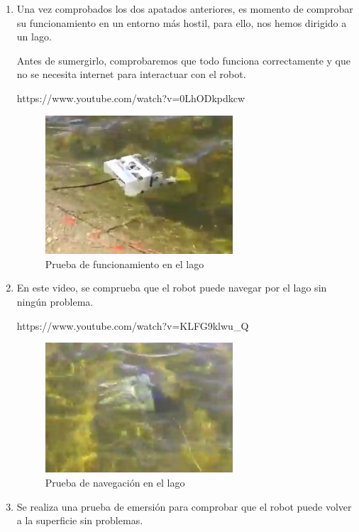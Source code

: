 \begin{enumerate}
\item Una vez comprobados los dos apatados anteriores, es momento de comprobar su funcionamiento en un entorno más hostil, para ello, nos hemos dirigido a un lago.
 
Antes de sumergirlo, comprobaremos que todo funciona correctamente y que no se necesita internet para interactuar con el robot.

https://www.youtube.com/watch?v=0LhODkpdkcw

 \begin{figure} [hbtp]
  \begin{center}
    \includegraphics[width=7cm]{img/cap5/lago1}
  \end{center}
  \caption{Prueba de funcionamiento en el lago}
  \label{fig:lago}
 \end{figure}
 

\newpage
\item En este video, se comprueba que el robot puede navegar por el lago sin ningún problema.
 
https://www.youtube.com/watch?v=KLFG9klwu\_Q
 
 \begin{figure} [hbtp]
  \begin{center}
    \includegraphics[width=7cm]{img/cap5/navegacion}
  \end{center}
  \caption{Prueba de navegación en el lago}
  \label{fig:navegacion}
 \end{figure}

\item Se realiza una prueba de emersión para comprobar que el robot puede volver a la superficie sin problemas.


\end{enumerate}
